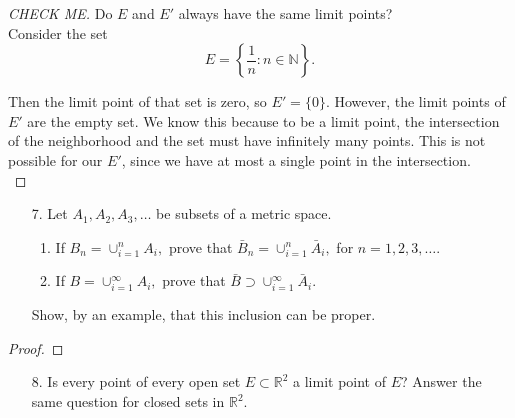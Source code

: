 \documentclass[10pt]{article}
\theoremstyle{definition}
\theoremstyle{plain}
\newcommand{\N}{\mathbb{N}}
\newcommand{\R}{\mathbb{R}}
\begin{document}
\begin{proof}[CHECK ME]
  Do $E$ and $E'$ always have the same limit points? \\

  Consider the set
  $$E = \left\{\frac{1}{n}: n\in\N\right\}.$$

  Then the limit point of that set is zero, so $E' = \{0\}$. However, the limit points of $E'$ are the empty set. We know this because to be a limit point, the intersection of the neighborhood and the set must have infinitely many points. This is not possible for our $E'$, since we have at most a single point in the intersection. \\
\end{proof}



\pagebreak



\begin{enumerate}
\item[7.] Let $A_1,A_2,A_3,\dots$ be subsets of a metric space.
\begin{enumerate}
  \item If $B_n = \cup_{i=1}^{n} A_i,$ prove that $\bar{B}_n = \cup_{i=1}^{n} \bar{A}_i,$ for $n=1,2,3,\dots$.
  \item If $B = \cup_{i=1}^{\infty} A_i,$ prove that $\bar{B} \supset \cup_{i=1}^{\infty} \bar{A}_i.$
\end{enumerate}
Show, by an example, that this inclusion can be proper.
\end{enumerate}

\begin{proof}

\end{proof}



\pagebreak



\begin{enumerate}
\item[8.] Is every point of every open set $E \subset \R^2$ a limit point of $E$? Answer the same question for closed sets in $\R^2$.
\end{enumerate}
\end{document}
